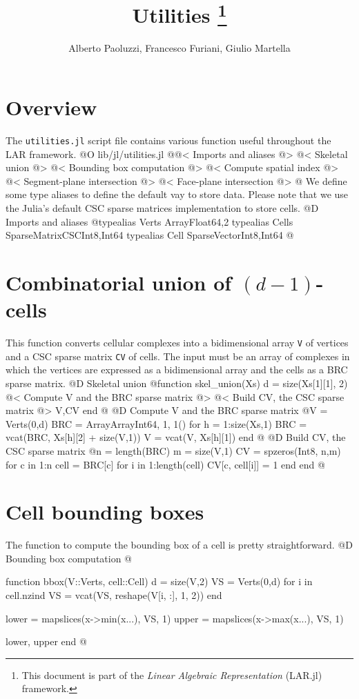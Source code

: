 \documentclass[10pt,oneside]{article}
\author{Alberto Paoluzzi, Francesco Furiani, Giulio Martella}
\title{Utilities
\footnote{This document is part of the \emph{Linear Algebraic Representation} (LAR.jl) framework.}
}
\begin{document}
\maketitle
\newpage

\section{Overview}
The \texttt{utilities.jl} script file contains various function useful throughout the LAR framework.
@O lib/jl/utilities.jl
@{@< Imports and aliases @>
@< Skeletal union @>
@< Bounding box computation @>
@< Compute spatial index @>
@< Segment-plane intersection @>
@< Face-plane intersection @>
@}
We define some type aliases to define the default vay to store data.
Please note that we use the Julia's default CSC sparse matrices implementation
to store cells.
@D Imports and aliases
@{typealias Verts Array{Float64,2}
typealias Cells SparseMatrixCSC{Int8,Int64}
typealias Cell SparseVector{Int8,Int64}
@}

\section{Combinatorial union of $(d-1)$-cells}
This function converts cellular complexes into a bidimensional array \texttt{V} of 
vertices and a CSC sparse matrix \texttt{CV} of cells. The input must be an array of complexes
in which the vertices are expressed as a bidimensional array and the cells as a BRC
sparse matrix.
@D Skeletal union
@{function skel_union(Xs)
    d = size(Xs[1][1], 2)
    @< Compute V and the BRC sparse matrix @>
    @< Build CV, the CSC sparse matrix @>
    V,CV
end
@}
@D Compute V and the BRC sparse matrix
@{V = Verts(0,d)
BRC = Array{Array{Int64, 1}, 1}()
for h = 1:size(Xs,1)
    BRC = vcat(BRC, Xs[h][2] + size(V,1))
    V = vcat(V, Xs[h][1])
end
@}
@D Build CV, the CSC sparse matrix
@{n = length(BRC)
m = size(V,1)
CV = spzeros(Int8, n,m)
for c in 1:n
    cell = BRC[c]
    for i in 1:length(cell)
        CV[c, cell[i]] = 1
    end
end
@}


\section{Cell bounding boxes}
The function to compute the bounding box of a cell
is pretty straightforward.
@D Bounding box computation
@{function bbox(V::Verts, cell::Cell)
    d = size(V,2)
    VS = Verts(0,d)
    for i in cell.nzind
        VS = vcat(VS, reshape(V[i, :], 1, 2))
    end
    
    lower = mapslices(x->min(x...), VS, 1)
    upper = mapslices(x->max(x...), VS, 1)
    
    lower, upper
end
@}
\end{document}
